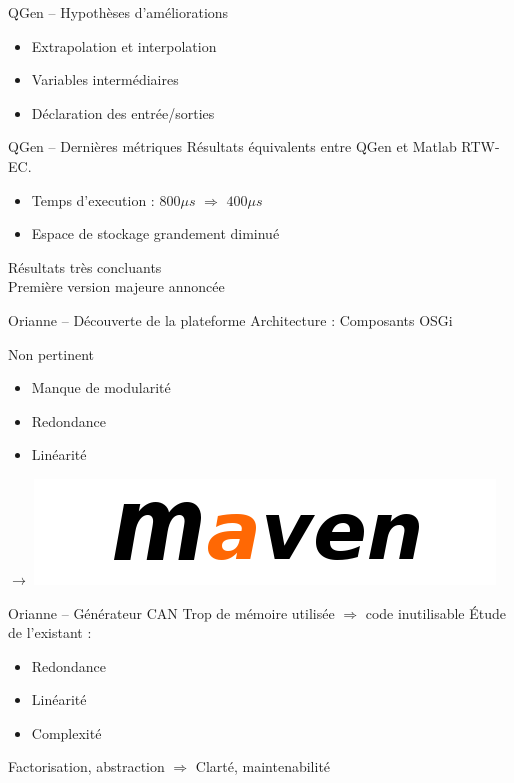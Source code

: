 \documentclass[xcolor=x11names,compress]{beamer}
\begin{document}
\begin{frame}{QGen -- Hypothèses d'améliorations}
  \vfill
  \begin{itemize}
	\item Extrapolation et interpolation
	\item Variables intermédiaires
	\item Déclaration des entrée/sorties
  \end{itemize}
  \vfill
\end{frame}

\begin{frame}{QGen -- Dernières métriques}
  \vfill
  Résultats équivalents entre QGen et Matlab RTW-EC.
  \begin{itemize}
	\item Temps d'execution : $800\mu s$ $\Rightarrow$ $400\mu s$
	\item Espace de stockage grandement diminué
  \end{itemize}
  \vfill
  \centering
  Résultats très concluants\\
  Première version majeure annoncée
  \vfill
\end{frame}


\begin{frame}{Orianne -- Découverte de la plateforme}
  \vfill
  Architecture : Composants OSGi
  \begin{alertblock}{Non pertinent}{}
	\begin{itemize}
	  \item Manque de modularité
	  \item Redondance
	  \item Linéarité
	\end{itemize}
  \end{alertblock}
  \vfill
  \centering
  {\Huge $\rightarrow$} \includegraphics[scale=0.25]{images/maven.png}
  \vfill
\end{frame}

\begin{frame}{Orianne -- Générateur CAN}
  Trop de mémoire utilisée $\Rightarrow$ code inutilisable
  \vfill
  Étude de l'existant :
  \begin{itemize}
	\item Redondance
	\item Linéarité
	\item Complexité
  \end{itemize}
  \vfill
  \centering
  Factorisation, abstraction $\Rightarrow$ Clarté, maintenabilité
  \vfill
\end{frame}
\end{document}
